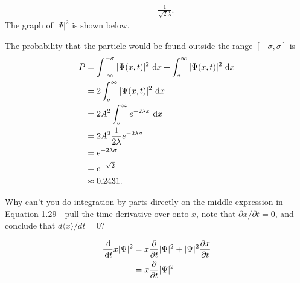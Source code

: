 \documentclass[en, oneside]{vivi}
\begin{document}
\begin{sol}
\begin{enumerate}[label=(\alph*)]
\begin{align*}
            &= \frac{1}{\sqrt{2} \lambda}.
        \end{align*}
        The graph of $|\Psi|^2$ is shown below.
        \begin{center}
        \end{center}
        The probability that the particle would be found outside the range $[-\sigma, \sigma]$ is
        \begin{align*}
            P &= \int_{-\infty}^{-\sigma} |\Psi (x, t)|^2 \dif x + \int_{\sigma}^{\infty} |\Psi (x, t)|^2 \dif x\\
            &= 2 \int_{\sigma}^{\infty} |\Psi (x, t)|^2 \dif x\\
            &= 2 A^2 \int_{\sigma}^{\infty} e^{-2 \lambda x} \dif x\\
            &= 2 A^2 \frac{1}{2 \lambda} e^{-2 \lambda \sigma}\\
            &= e^{-2 \lambda \sigma}\\
            &= e^{-\sqrt{2}}\\
            &\approx 0.2431.
        \end{align*}
    \end{enumerate}
\end{sol}

\begin{prob}
    Why can't you do integration-by-parts directly on the middle expression in Equation 1.29—pull the time derivative over onto $x$, note that $\partial x / \partial t = 0$, and conclude that $d \langle x \rangle / dt = 0$?
\end{prob}

\begin{sol}
    \begin{align}
        \frac{\dif}{\dif t} x \lvert \Psi \rvert^2 &= x \frac{\partial}{\partial t} \lvert \Psi \rvert^2 + \lvert \Psi \rvert^2 \frac{\partial x}{\partial t}\\
        &= x \frac{\partial}{\partial t} \lvert \Psi \rvert^2
    \end{align}
\end{sol}
\end{document}
